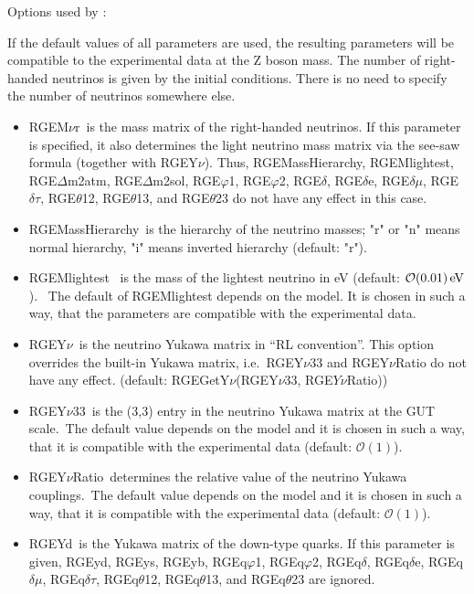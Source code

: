 \documentclass[10pt,a4paper,twoside]{scrartcl}
\begin{document}
Options used by :

If the default values of all parameters are used, the resulting parameters will
be compatible to the experimental data at the Z boson mass. The number of right-handed neutrinos is given by the initial conditions. There
is no need to specify the number of neutrinos somewhere else.
\begin{itemize}
\item RGEM$\nu$r\ is the mass matrix of the right-handed neutrinos.
  If this parameter is specified, it also determines the light neutrino
  mass matrix via the see-saw formula (together with RGEY$\nu$).  Thus,
  RGEMassHierarchy, RGEMlightest, RGE$\Delta$m2atm, RGE$\Delta$m2sol,
  RGE$\varphi$1, RGE$\varphi$2, RGE$\delta$, RGE$\delta$e,
  RGE$\delta\mu$, RGE$\delta\tau$, RGE$\theta$12, RGE$\theta$13, and
  RGE$\theta$23 do not have any effect in this case.
  
\item RGEMassHierarchy\ is the hierarchy of the neutrino masses; "r" or "n"
  means normal hierarchy, "i" means inverted hierarchy (default: "r").
  
\item RGEMlightest \ is the mass of the lightest neutrino in eV (default: $\mathcal{O}(0.01)
  \,\mathrm{eV}$).
  \ The default of RGEMlightest depends on the
model. It is chosen in such a way, that the parameters are compatible with the
experimental data.
\item RGEY$\nu$\ is the neutrino Yukawa matrix in ``RL convention''. This option overrides the
  built-in Yukawa matrix, i.e.\ RGEY$\nu33$ and RGEY$\nu$Ratio do not have any
  effect. 
    (default: RGEGetY$\nu$(RGEY$\nu33$, RGE$Y\nu$Ratio))
  
\item RGEY$\nu$33\ is the (3,3) entry in the neutrino Yukawa matrix at the GUT
  scale.\ The default value depends on the
  model and it is chosen in such a way, that it is compatible with the
  experimental data (default: $\mathcal{O}(1)$).
  
\item RGEY$\nu$Ratio\ determines the relative value of the neutrino Yukawa couplings.\ The default value depends on the
  model and it is chosen in such a way, that it is compatible with the
  experimental data (default: $\mathcal{O}(1)$).
\item RGEYd\ is the Yukawa matrix of the down-type quarks.
  If this parameter is given, RGEyd, RGEys, RGEyb, RGEq$\varphi$1,
  RGEq$\varphi$2, RGEq$\delta$, RGEq$\delta$e, RGEq$\delta\mu$,
  RGEq$\delta\tau$, RGEq$\theta$12, RGEq$\theta$13, and RGEq$\theta$23
  are ignored.
  

\end{itemize}
\end{document}
